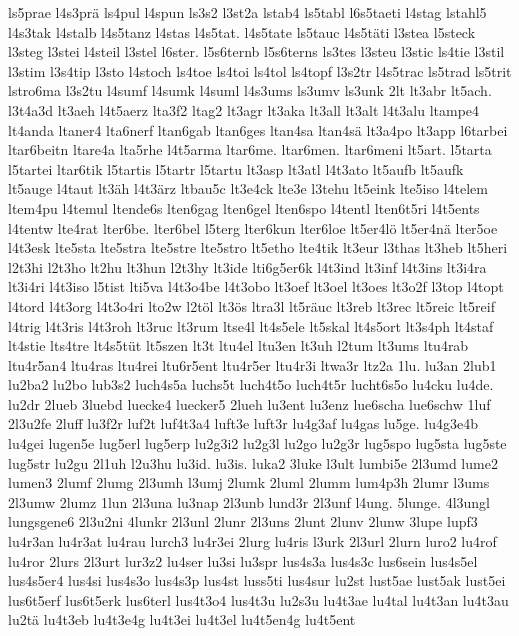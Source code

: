 {ls5prae
l4s3prä
ls4pul
l4spun
ls3s2
l3st2a
lstab4
ls5tabl
l6s5taeti
l4stag
lstahl5
l4s3tak
l4stalb
l4s5tanz
l4stas
l4s5tat.
l4s5tate
ls5tauc
l4s5täti
l3stea
l5steck
l3steg
l3stei
l4steil
l3stel
l6ster.
l5s6ternb
l5s6terns
ls3tes
l3steu
l3stic
ls4tie
l3stil
l3stim
l3s4tip
l3sto
l4stoch
ls4toe
ls4toi
ls4tol
ls4topf
l3s2tr
l4s5trac
ls5trad
ls5trit
lstro6ma
l3s2tu
l4sumf
l4sumk
l4suml
l4s3ums
ls3umv
ls3unk
2lt
lt3abr
lt5ach.
l3t4a3d
lt3aeh
l4t5aerz
lta3f2
ltag2
lt3agr
lt3aka
lt3all
lt3alt
l4t3alu
ltampe4
lt4anda
ltaner4
lta6nerf
ltan6gab
ltan6ges
ltan4sa
ltan4sä
lt3a4po
lt3app
l6tarbei
ltar6beitn
ltare4a
lta5rhe
l4t5arma
ltar6me.
ltar6men.
ltar6meni
lt5art.
l5tarta
l5tartei
ltar6tik
l5tartis
l5tartr
l5tartu
lt3asp
lt3atl
l4t3ato
lt5aufb
lt5aufk
lt5auge
l4taut
lt3äh
l4t3ärz
ltbau5c
lt3e4ck
lte3e
l3tehu
lt5eink
lte5iso
l4telem
ltem4pu
l4temul
ltende6s
lten6gag
lten6gel
lten6spo
l4tentl
lten6t5ri
l4t5ents
l4tentw
lte4rat
lter6be.
lter6bel
l5terg
lter6kun
lter6loe
lt5er4lö
lt5er4nä
lter5oe
l4t3esk
lte5sta
lte5stra
lte5stre
lte5stro
lt5etho
lte4tik
lt3eur
l3thas
lt3heb
lt5heri
l2t3hi
l2t3ho
lt2hu
lt3hun
l2t3hy
lt3ide
lti6g5er6k
l4t3ind
lt3inf
l4t3ins
lt3i4ra
lt3i4ri
l4t3iso
l5tist
lti5va
l4t3o4be
l4t3obo
lt3oef
lt3oel
lt3oes
lt3o2f
l3top
l4topt
l4tord
l4t3org
l4t3o4ri
lto2w
l2töl
lt3ös
ltra3l
lt5räuc
lt3reb
lt3rec
lt5reic
lt5reif
l4trig
l4t3ris
l4t3roh
lt3ruc
lt3rum
ltse4l
lt4s5ele
lt5skal
lt4s5ort
lt3s4ph
lt4staf
lt4stie
lts4tre
lt4s5tüt
lt5szen
lt3t
ltu4el
ltu3en
lt3uh
l2tum
lt3ums
ltu4rab
ltu4r5an4
ltu4ras
ltu4rei
ltu6r5ent
ltu4r5er
ltu4r3i
ltwa3r
ltz2a
1lu.
lu3an
2lub1
lu2ba2
lu2bo
lub3s2
luch4s5a
luchs5t
luch4t5o
luch4t5r
lucht6s5o
lu4cku
lu4de.
lu2dr
2lueb
3luebd
luecke4
luecker5
2lueh
lu3ent
lu3enz
lue6scha
lue6schw
1luf
2l3u2fe
2luff
lu3f2r
luf2t
luf4t3a4
luft3e
luft3r
lu4g3af
lu4gas
lu5ge.
lu4g3e4b
lu4gei
lugen5e
lug5erl
lug5erp
lu2g3i2
lu2g3l
lu2go
lu2g3r
lug5spo
lug5sta
lug5ste
lug5str
lu2gu
2l1uh
l2u3hu
lu3id.
lu3is.
luka2
3luke
l3ult
lumbi5e
2l3umd
lume2
lumen3
2lumf
2lumg
2l3umh
l3umj
2lumk
2luml
2lumm
lum4p3h
2lumr
l3ums
2l3umw
2lumz
1lun
2l3una
lu3nap
2l3unb
lund3r
2l3unf
l4ung.
5lunge.
4l3ungl
lungsgene6
2l3u2ni
4lunkr
2l3unl
2lunr
2l3uns
2lunt
2lunv
2lunw
3lupe
lupf3
lu4r3an
lu4r3at
lu4rau
lurch3
lu4r3ei
2lurg
lu4ris
l3urk
2l3url
2lurn
luro2
lu4rof
lu4ror
2lurs
2l3urt
lur3z2
lu4ser
lu3si
lu3spr
lus4s3a
lus4s3c
lus6sein
lus4s5el
lus4s5er4
lus4si
lus4s3o
lus4s3p
lus4st
luss5ti
lus4sur
lu2st
lust5ae
lust5ak
lust5ei
lus6t5erf
lus6t5erk
lus6terl
lus4t3o4
lus4t3u
lu2s3u
lu4t3ae
lu4tal
lu4t3an
lu4t3au
lu2tä
lu4t3eb
lu4t3e4g
lu4t3ei
lu4t3el
lu4t5en4g
lu4t5ent
}
